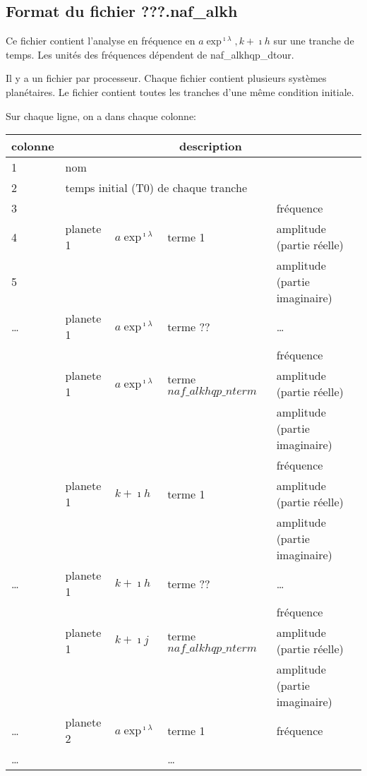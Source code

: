 \documentclass[11pt]{article}
\begin{document}
\subsection{Format du fichier {\bf ???.naf\_alkh} }

Ce fichier contient l'analyse en fr\'equence en $a\exp^{\imath\lambda}, k+\imath h$ sur une tranche de temps. Les unit\'es des fr\'equences d\'ependent de naf\_alkhqp\_dtour.

 Il y a un fichier par processeur. Chaque fichier contient plusieurs syst\`emes plan\'etaires. Le fichier contient toutes les tranches d'une m\^eme  condition initiale.


Sur chaque ligne, on a dans chaque colonne: 

\begin{tabularx}{\textwidth}{|l|l|l|l|X|}
 \hline
 colonne &      \multicolumn{4}{c|}{description} \\ \hline
1  &    \multicolumn{4}{l|}{nom} \\ \hline
2  &    \multicolumn{4}{l|}{temps initial (T0) de chaque tranche} \\ \hline
3 & &   & & fr\'equence\\
4 &planete 1 &$a\exp^{\imath\lambda}$& terme 1 & amplitude (partie r\'eelle)\\
5 & &   & &amplitude (partie imaginaire)\\ \hline
\dots & planete 1 &$a\exp^{\imath\lambda}$& terme ?? &\dots \\ \hline
 & &   & &fr\'equence\\
 &planete 1 & $a\exp^{\imath\lambda}$ & terme $naf\_alkhqp\_nterm$ & amplitude (partie r\'eelle)\\
 & &   & &amplitude (partie imaginaire)\\ \hline
 & &   & & fr\'equence\\
 &planete 1 &$k+\imath h$& terme 1 & amplitude (partie r\'eelle)\\
 & &   & &amplitude (partie imaginaire)\\ \hline
\dots & planete 1 &$k+\imath h$& terme ?? &\dots \\ \hline
 & &   & &fr\'equence\\
 &planete 1 & $k+\imath j$ & terme $naf\_alkhqp\_nterm$ & amplitude (partie r\'eelle)\\
 & &   & &amplitude (partie imaginaire)\\ \hline
\dots & planete 2 &$a\exp^{\imath\lambda}$& terme 1 &fr\'equence \\ \hline
\dots & & & \dots &\\\hline
\end{tabularx}
\end{document}
